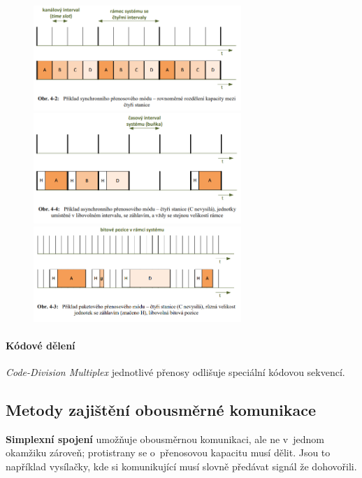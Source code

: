 \begin{figure}[ht]
	\centering
	\includegraphics[width=0.7\textwidth]{images/q04_time_synchronous}
	\includegraphics[width=0.7\textwidth]{images/q04_time_asynchronous}
	\includegraphics[width=0.7\textwidth]{images/q04_time_packet}
\end{figure}

\paragraph{Kódové dělení} \emph{Code-Division Multiplex} jednotlivé přenosy odlišuje speciální kódovou sekvencí.

\subsection{Metody zajištění obousměrné komunikace}
\label{q07}

\textbf{Simplexní spojení} umožňuje obousměrnou komunikaci, ale ne v~jednom okamžiku zároveň; protistrany se o~přenosovou kapacitu musí dělit. Jsou to například vysílačky, kde si komunikující musí slovně předávat signál že dohovořili.

